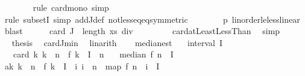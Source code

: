 \begin{isabellebody}
\ \ \ \ \ \ \isamarkupfalse%
\ {\isacharparenleft}{\kern0pt}rule\ card{\isacharunderscore}{\kern0pt}mono{\isacharcomma}{\kern0pt}\ simp{\isacharparenright}{\kern0pt}\isanewline
\ \ \ \ \ \ \isamarkupfalse%
\ {\isacharparenleft}{\kern0pt}rule\ subsetI{\isacharcomma}{\kern0pt}\ simp\ add{\isacharcolon}{\kern0pt}J{\isacharunderscore}{\kern0pt}def\ not{\isacharunderscore}{\kern0pt}less{\isacharunderscore}{\kern0pt}eq{\isacharunderscore}{\kern0pt}eq{\isacharbrackleft}{\kern0pt}symmetric{\isacharbrackright}{\kern0pt}{\isacharparenright}{\kern0pt}\isanewline
\ \ \ \ \ \ \isamarkupfalse%
\ p\ linorder{\isacharunderscore}{\kern0pt}le{\isacharunderscore}{\kern0pt}less{\isacharunderscore}{\kern0pt}linear\ \isamarkupfalse%
\ blast\isanewline
\ \ \ \ \isamarkupfalse%
\ {\isachardoublequoteopen}card\ J\ {\isasymle}\ {\isacharparenleft}{\kern0pt}length\ xs\ div\ {}{\isacharparenright}{\kern0pt}{\isachardoublequoteclose}\isanewline
\ \ \ \ \ \ \isamarkupfalse%
\ card{\isacharunderscore}{\kern0pt}atLeastLessThan\ \isamarkupfalse%
\ simp\isanewline
\ \ \ \ \isamarkupfalse%
\ \isamarkupfalse%
\ {\isacharquery}{\kern0pt}thesis\ \isamarkupfalse%
\ card{\isacharunderscore}{\kern0pt}J{\isacharunderscore}{\kern0pt}min\ \isamarkupfalse%
\ linarith\isanewline
\ \ \isamarkupfalse%
\isanewline
{}\isamarkupfalse%
%
\endisatagproof
{\isafoldproof}%
%
\isadelimproof
\isanewline
%
\endisadelimproof
\isanewline
{}\isamarkupfalse%
\ median{\isacharunderscore}{\kern0pt}est{\isacharcolon}{\kern0pt}\isanewline
\ \ \ {\isachardoublequoteopen}interval\ I{\isachardoublequoteclose}\isanewline
\ \ \ {\isachardoublequoteopen}{}{\isacharasterisk}{\kern0pt}card\ {\isacharbraceleft}{\kern0pt}k{\isachardot}{\kern0pt}\ k\ {\isacharless}{\kern0pt}\ n\ {\isasymand}\ f\ k\ {\isasymin}\ I{\isacharbraceright}{\kern0pt}\ {\isachargreater}{\kern0pt}\ n{\isachardoublequoteclose}\isanewline
\ \ \ {\isachardoublequoteopen}median\ f\ n\ {\isasymin}\ I{\isachardoublequoteclose}\isanewline
%
\isadelimproof
%
\endisadelimproof
%
\isatagproof
{}\isamarkupfalse%
\ {\isacharminus}{\kern0pt}\isanewline
\ \ \isamarkupfalse%
\ a{\isacharcolon}{\kern0pt}{\isachardoublequoteopen}{\isacharbraceleft}{\kern0pt}k{\isachardot}{\kern0pt}\ k\ {\isacharless}{\kern0pt}\ n\ {\isasymand}\ f\ k\ {\isasymin}\ I{\isacharbraceright}{\kern0pt}\ {\isacharequal}{\kern0pt}\ {\isacharbraceleft}{\kern0pt}i{\isachardot}{\kern0pt}\ i\ {\isacharless}{\kern0pt}\ n\ {\isasymand}\ map\ f\ {\isacharbrackleft}{\kern0pt}{}{\isachardot}{\kern0pt}{\isachardot}{\kern0pt}{\isacharless}{\kern0pt}n{\isacharbrackright}{\kern0pt}\ {\isacharbang}{\kern0pt}\ i\ {\isasymin}\ I{\isacharbraceright}{\kern0pt}{\isachardoublequoteclose}\isanewline

\end{isabellebody}
